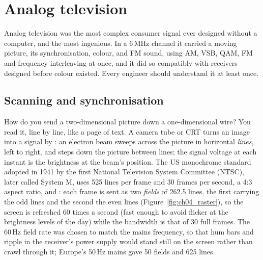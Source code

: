 \section{Analog television}
\label{sec:ch04:tv}

Analog television was the most complex consumer signal ever designed without a computer, and the most
ingenious. In a 6\,MHz channel it carried a moving picture, its synchronisation, colour, and FM sound, using
AM, VSB, QAM, FM and frequency interleaving at once, and it did so compatibly with receivers designed before
colour existed. Every engineer should understand it at least once.

\subsection{Scanning and synchronisation}


How do you send a two-dimensional picture down a one-dimensional wire? You read it, line by line, like a
page of text. A camera tube or CRT turns an image into a signal by : an electron beam
sweeps across the picture in horizontal \emph{lines}, left to right, and steps down the picture between
lines; the signal voltage at each instant is the brightness at the beam's position. The US monochrome
standard adopted in 1941 by the first National Television System Committee (NTSC), later called System M,
uses 525 lines per frame and 30 frames per second, a 4:3 aspect ratio, and : each frame is
sent as two \emph{fields} of 262.5 lines, the first carrying the odd lines and the second the even lines
(Figure~\ref{fig:ch04_raster}), so the screen is refreshed 60 times a second (fast enough to avoid flicker at
the brightness levels of the day) while the bandwidth is that of 30 full frames. The 60\,Hz field rate was
chosen to match the mains frequency, so that hum bars and ripple in the receiver's power supply would stand
still on the screen rather than crawl through it; Europe's 50\,Hz mains gave 50 fields and 625 lines.

